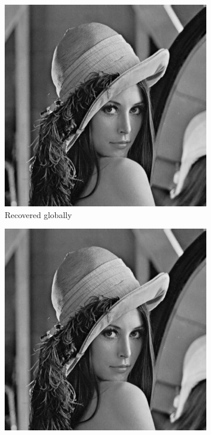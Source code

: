 \documentclass{article}
\begin{document}
	\begin{figure}[htb!]
		\centering
		\begin{subfigure}[t]{0.25\textwidth}
			\centering
			\includegraphics[width=\textwidth]{img/lena_recover.jpg}
			\caption{\label{fig:lena-recover}Recovered globally}
		\end{subfigure}
		\hspace{10em}
		\begin{subfigure}[t]{0.25\textwidth}
			\centering
			\includegraphics[width=\textwidth]{img/lena_patches_recover.jpg}

\end{subfigure}
\end{figure}
\end{document}
